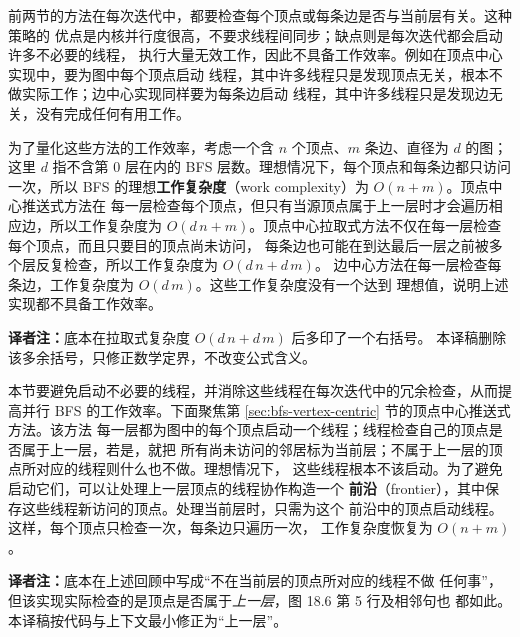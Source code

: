 前两节的方法在每次迭代中，都要检查每个顶点或每条边是否与当前层有关。这种策略的
优点是内核并行度很高，不要求线程间同步；缺点则是每次迭代都会启动许多不必要的线程，
执行大量无效工作，因此不具备工作效率。例如在顶点中心实现中，要为图中每个顶点启动
线程，其中许多线程只是发现顶点无关，根本不做实际工作；边中心实现同样要为每条边启动
线程，其中许多线程只是发现边无关，没有完成任何有用工作。

为了量化这些方法的工作效率，考虑一个含 $n$ 个顶点、$m$ 条边、直径为 $d$ 的图；这里
$d$ 指不含第 0 层在内的 BFS 层数。理想情况下，每个顶点和每条边都只访问一次，所以
BFS 的理想\textbf{工作复杂度}（work complexity）为 $O(n+m)$。顶点中心推送式方法在
每一层检查每个顶点，但只有当源顶点属于上一层时才会遍历相应边，所以工作复杂度为
$O(d\,n+m)$。顶点中心拉取式方法不仅在每一层检查每个顶点，而且只要目的顶点尚未访问，
每条边也可能在到达最后一层之前被多个层反复检查，所以工作复杂度为 $O(d\,n+d\,m)$。
边中心方法在每一层检查每条边，工作复杂度为 $O(d\,m)$。这些工作复杂度没有一个达到
理想值，说明上述实现都不具备工作效率。

\noindent\textbf{译者注：}底本在拉取式复杂度 $O(d\,n+d\,m)$ 后多印了一个右括号。
本译稿删除该多余括号，只修正数学定界，不改变公式含义。

本节要避免启动不必要的线程，并消除这些线程在每次迭代中的冗余检查，从而提高并行 BFS
的工作效率。下面聚焦第 \ref{sec:bfs-vertex-centric} 节的顶点中心推送式方法。该方法
每一层都为图中的每个顶点启动一个线程；线程检查自己的顶点是否属于上一层，若是，就把
所有尚未访问的邻居标为当前层；不属于上一层的顶点所对应的线程则什么也不做。理想情况下，
这些线程根本不该启动。为了避免启动它们，可以让处理上一层顶点的线程协作构造一个
\textbf{前沿}（frontier），其中保存这些线程新访问的顶点。处理当前层时，只需为这个
前沿中的顶点启动线程\cite{luo2010bfs}。这样，每个顶点只检查一次，每条边只遍历一次，
工作复杂度恢复为 $O(n+m)$。

\noindent\textbf{译者注：}底本在上述回顾中写成“不在当前层的顶点所对应的线程不做
任何事”，但该实现实际检查的是顶点是否属于\emph{上一层}，图 18.6 第 5 行及相邻句也
都如此。本译稿按代码与上下文最小修正为“上一层”。

